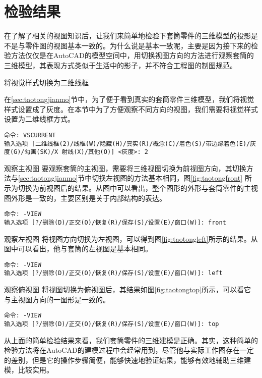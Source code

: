 \section{检验结果}
在了解了相关的视图知识后，让我们来简单地检验下套筒零件的三维模型的投影是不是与零件图的视图基本一致的。为什么说是基本一致呢，主要是因为接下来的检验方法仅仅是在AutoCAD的模型空间中，用切换视图方向的方法进行观察套筒的三维模型，其表现方式类似于生活中的影子，并不符合工程图的制图规范。

\begin{procedure}
\item 将视觉样式切换为二维线框

在\ref{sec:taotongjianmo}节中，为了便于看到真实的套筒零件三维模型，我们将视觉样式设置成了灰度。在本节中为了方便观察不同方向的视图，我们需要将视觉样式设置为二维线框方式。

\begin{lstlisting}
命令: VSCURRENT
输入选项 [二维线框(2)/线框(W)/隐藏(H)/真实(R)/概念(C)/着色(S)/带边缘着色(E)/灰度(G)/勾画(SK)/X 射线(X)/其他(O)] <灰度>: 2
\end{lstlisting}
\item 观察主视图
要观察套筒的主视图，需要将三维视图切换为前视图方向，其切换方法与\ref{sec:taotongjianmo}节中切换左视图的方法基本相同，图\ref{fig:taotongfront} 所示为切换为前视图后的结果。从图中可以看出，整个图形的外形与套筒零件的主视图外形是一致的，主要区别是关于内部结构的表达。

\begin{lstlisting}
命令: -VIEW
输入选项 [?/删除(D)/正交(O)/恢复(R)/保存(S)/设置(E)/窗口(W)]: front
\end{lstlisting}
\item 观察左视图
将视图方向切换为左视图，可以得到图\ref{fig:taotongleft}所示的结果。从图中可以看出，他与套筒的左视图是基本相同。
\begin{lstlisting}
命令: -VIEW
输入选项 [?/删除(D)/正交(O)/恢复(R)/保存(S)/设置(E)/窗口(W)]: left
\end{lstlisting}
\item 观察俯视图
将视图切换为俯视图后，其结果如图\ref{fig:taotongtop}所示，可以看它与主视图方向的一图形是一致的。
\begin{lstlisting}
命令: -VIEW
输入选项 [?/删除(D)/正交(O)/恢复(R)/保存(S)/设置(E)/窗口(W)]: top
\end{lstlisting}
\begin{figure}[htbp]
\hspace{15pt}
\hspace{15pt}
\end{figure}
\end{procedure}

从上面的简单检验结果来看，我们套筒零件的三维建模是正确。其实，这种简单的检验方法将在AutoCAD的建模过程中会经常用到，尽管他与实际工作图存在一定的差别，但是它的操作步骤简便，能够快速地验证结果，能够有效地辅助三维建模，比较实用。
\endinput
